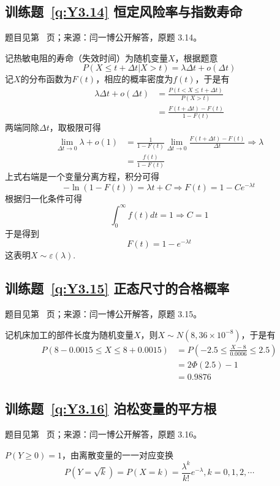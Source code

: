 \documentclass[UTF8,12pt,a4paper,fontset=fandol]{ctexbook}
\begin{document}
\subsection*{训练题~\ref{q:Y3.14} 恒定风险率与指数寿命}\label{a:Y3.14}{\small 题目见第~\pageref{q:Y3.14} 页；来源：闫一博公开解答，原题 3.14。}
\begin{solve}
记热敏电阻的寿命（失效时间）为随机变量$X$，根据题意
\[P(X \leqslant t + \Delta t|X > t) = \lambda \Delta t + o(\Delta t)\]
记$X$的分布函数为$F(t)$，相应的概率密度为$f(t)$，于是有
\[\begin{aligned}\lambda \Delta t + o(\Delta t) &= \frac{{P(t < X \leqslant t + \Delta t)}}{{P(X > t)}} \\&= \frac{{F(t + \Delta t) - F(t)}}{{1 - F(t)}}\end{aligned}\]
两端同除$\Delta t$，取极限可得
\[\begin{aligned}\mathop {\lim }\limits_{\Delta t \to 0} \lambda  + o(1) &= \frac{1}{{1 - F(t)}}\mathop {\lim }\limits_{\Delta t \to 0} \frac{{F(t + \Delta t) - F(t)}}{{\Delta t}} \Rightarrow \lambda  \\&= \frac{{f(t)}}{{1 - F(t)}}\end{aligned}\]
上式右端是一个变量分离方程，积分可得
\[ - \ln (1 - F(t)) = \lambda t + C \Rightarrow F(t) = 1 - C{e^{ - \lambda t}}\]
根据归一化条件可得
\[\int_0^\infty  {f(t)dt}  = 1 \Rightarrow C = 1\]
于是得到
\[F(t) = 1 - {e^{ - \lambda t}}\]
这表明$X\sim \varepsilon(\lambda)$.
\end{solve}

\subsection*{训练题~\ref{q:Y3.15} 正态尺寸的合格概率}\label{a:Y3.15}{\small 题目见第~\pageref{q:Y3.15} 页；来源：闫一博公开解答，原题 3.15。}
\begin{solve}
记机床加工的部件长度为随机变量$X$，则$X\sim N(8,36\times 10^{-8})$，于是有
\[\begin{aligned}P(8 - 0.0015 \leqslant X \leqslant 8 + 0.0015) &= P( - 2.5 \leqslant \frac{{X - 8}}{{0.0006}} \leqslant 2.5) \\&= 2\Phi (2.5) - 1 \\&= 0.9876\end{aligned}\]
\end{solve}

\subsection*{训练题~\ref{q:Y3.16} 泊松变量的平方根}\label{a:Y3.16}{\small 题目见第~\pageref{q:Y3.16} 页；来源：闫一博公开解答，原题 3.16。}
\begin{solve}
$P(Y\geqslant 0)=1$，由离散变量的一一对应变换
\[P(Y = \sqrt k ) = P(X = k) = \frac{{{\lambda ^k}}}{{k!}}{e^{ - \lambda }},k = 0,1,2, \cdots \]
\end{solve}
\end{document}
